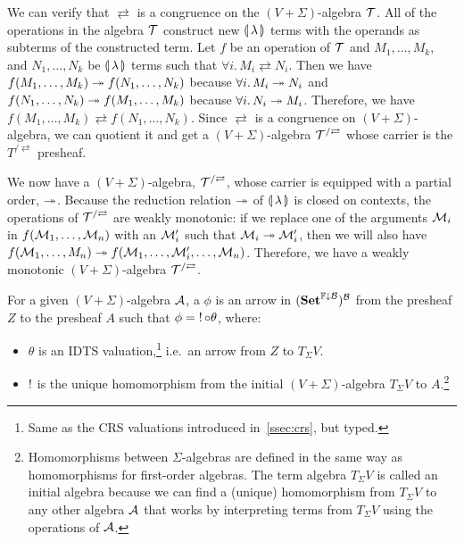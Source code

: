 We can verify that $\rightleftarrows$ is a congruence on the
$(V + \Sigma)$-algebra $\mathcal{T}$. All of the operations in the algebra $\mathcal{T}$
construct new ${\llparenthesis \, \lambda \, \rrparenthesis}$ terms with the operands as subterms of the
constructed term. Let $f$ be an operation of $\mathcal{T}$ and $M_1, \ldots, M_k$,
and $N_1, \ldots, N_k$ be ${\llparenthesis \, \lambda \, \rrparenthesis}$ terms such that
$\forall i.\, M_i \rightleftarrows N_i$. Then we have
$f(M_1, \ldots, M_k) \twoheadrightarrow f(N_1, \ldots, N_k)$ because
$\forall i.\, M_i \twoheadrightarrow N_i$ and
$f(N_1, \ldots, N_k) \twoheadrightarrow f(M_1, \ldots, M_k)$ because
$\forall i.\, N_i \twoheadrightarrow M_i$. Therefore, we have
$f(M_1, \ldots, M_k) \rightleftarrows f(N_1, \ldots, N_k)$. Since
$\rightleftarrows$ is a congruence on $(V + \Sigma)$-algebra, we can
quotient it and get a $(V + \Sigma)$-algebra $\mathcal{T}^{/\rightleftarrows}$
whose carrier is the $T^{/\rightleftarrows}$ presheaf.

We now have a $(V + \Sigma)$-algebra, $\mathcal{T}^{/\rightleftarrows}$, whose
carrier is equipped with a partial order, $\twoheadrightarrow$. Because the reduction
relation $\twoheadrightarrow$ of ${\llparenthesis \, \lambda \, \rrparenthesis}$ is closed on contexts, the operations of
$\mathcal{T}^{/\rightleftarrows}$ are weakly monotonic: if we replace one of the
arguments $\mathcal{M}_i$ in $f(\mathcal{M}_1, \ldots, \mathcal{M}_n)$ with an $\mathcal{M}'_i$ such
that $\mathcal{M}_i \twoheadrightarrow \mathcal{M}_i'$, then we will also have
$f(\mathcal{M}_1, \ldots, M_n) \twoheadrightarrow f(\mathcal{M}_1, \ldots, \mathcal{M}'_i, \ldots,
\mathcal{M}_n)$. Therefore, we have a weakly monotonic $(V+\Sigma)$-algebra
$\mathcal{T}^{/\rightleftarrows}$.

\begin{definition}
  For a given $(V+\Sigma)$-algebra $\mathcal{A}$, a  $\phi$ is an arrow in $(\mathbf{Set}^{\mathbb{F}\downarrow\mathcal{B}})^{\mathcal{B}}$ from the
  presheaf $Z$ to the presheaf $A$ such that $\phi = \mathop{!} {\mathbin{\circ}} \theta$,
  where:

  \begin{itemize}
  \item $\theta$ is an IDTS valuation,\footnote{Same as the CRS valuations
      introduced in~\ref{ssec:crs}, but typed.} i.e.\ an arrow from $Z$ to
    $T_\Sigma V$.
  \item $\mathop{!}$ is the unique homomorphism from the initial
    $(V+\Sigma)$-algebra $T_\Sigma V$ to $A$.\footnote{Homomorphisms
      between $\Sigma$-algebras are defined in the same way as
      homomorphisms for first-order algebras. The term algebra $T_\Sigma V$
      is called an initial algebra because we can find a (unique)
      homomorphism from $T_\Sigma V$ to any other algebra $\mathcal{A}$ that works
      by interpreting terms from $T_\Sigma V$ using the operations of
      $\mathcal{A}$.}
  \end{itemize}
\end{definition}

